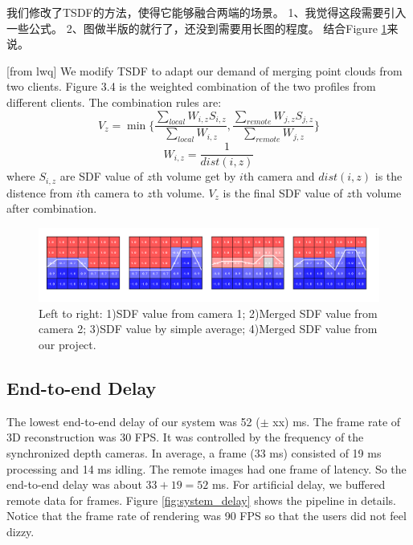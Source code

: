 我们修改了TSDF的方法，使得它能够融合两端的场景。
1、我觉得这段需要引入一些公式。
2、图做半版的就行了，还没到需要用长图的程度。
结合Figure \ref{fig:TSDF_merge_two_sides}来说。
    

[from lwq] We modify TSDF to adapt our demand of merging point clouds from two clients. Figure 3.4 is the weighted combination of the two profiles from different clients. The combination rules are:
\begin{equation}
V_z=\min\{\frac{\sum_{local} W_{i,z}S_{i,z}}{\sum_{local} W_{i,z}},\frac{\sum_{remote} W_{j,z}S_{j,z}}{\sum_{remote} W_{j,z}}\}
\end{equation}
\begin{equation}
W_{i,z}=\frac{1}{dist(i,z)}    
\end{equation}
where $S_{i,z}$ are SDF value of $z$th volume get by $i$th camera and $dist(i,z)$ is the distence from $i$th camera to $z$th volume. $V_z$ is the final SDF value of $z$th volume after combination.

\begin{figure}[!htbp]
\centering
\includegraphics[width=1.0\linewidth]{figures/figure_tsdf.png}
\caption{Left to right: 1)SDF value from camera 1; 2)Merged SDF value from camera 2; 3)SDF value by simple average; 4)Merged SDF value from our project.}
\label{fig:TSDF_merge_two_sides}
\end{figure}

\subsection{End-to-end Delay}

The lowest end-to-end delay of our system was 52 ($\pm$ xx) ms. The frame rate of 3D reconstruction was 30 FPS. It was controlled by the frequency of the synchronized depth cameras. In average, a frame (33 ms) consisted of 19 ms processing and 14 ms idling. The remote images had one frame of latency. So the end-to-end delay was about $33 + 19 = 52$ ms. For artificial delay, we buffered remote data for frames. Figure \ref{fig:system_delay} shows the pipeline in details. Notice that the frame rate of rendering was 90 FPS so that the users did not feel dizzy.

